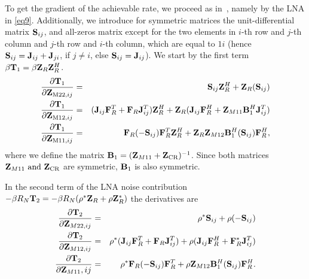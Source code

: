 To get the gradient of the achievable rate, we proceed as in~\cite{Yahia2013}, namely
by the LNA in  \eqref{eq9}.
Additionally, we introduce for symmetric matrices the unit-differential matrix $\mathbf{S}_{ij}$, and all-zeros matrix except for the two elements in $i$-th row and $j$-th column and $j$-th row and $i$-th column, which are equal to $1i$ (hence $\mathbf{S}_{ij} = \mathbf{J}_{ij} + \mathbf{J}_{ji}$, if $j\neq i$, else $\mathbf{S}_{ij} = \mathbf{J}_{ij}$). We start by the first term  $\beta\mathbf{T}_1=\beta \mathbf{Z}_R\mathbf{Z}_R^H$. 
\begin{eqnarray}
\frac{\partial \mat{T}_1}{\partial \mat{Z}_{\text{M22,}ij}}&=& 
	\mat{S}_{ij}\mat{Z}_R^H+\mat{Z}_R(\mat{S}_{ij}) \nonumber\\
\frac{\partial \mat{T}_1}{\partial \mat{Z}_{\text{M12,}ij}}&=& 
	(\mat{J}_{ij}\mat{F}_R^T+\mat{F}_R\mat{J}_{ij}^T)\mat{Z}_R^H+ %
\mat{Z}_R(\mat{J}_{ij}\mat{F}_R^H+\mat{Z}_{M11}\mat{B}_1^H\mat{J}_{ij}^T)  \nonumber \\
\frac{\partial \mat{T}_1}{\partial \mat{Z}_{\text{M11,}ij}}&=&
	\mat{F}_R(-\mat{S}_{ij})\mat{F}_R^T \mat{Z}_R^H +
	\mat{Z}_R\mat{Z}_{M12}\mat{B}_1^H(\mat{S}_{ij})\mat{F}_R^H,
\label{Shorteneddeirvatives}
\end{eqnarray}
where we define the matrix $\mathbf{B}_1=(\mathbf{Z}_{M11}+\mathbf{Z}_{\text{CR}})^{-1}$. Since both matrices $\mathbf{Z}_{M11}\text{ and }\mathbf{Z}_{\text{CR}}$ are symmetric, $\mathbf{B}_1$ is also symmetric.


In the second term of the LNA noise contribution $-\beta R_N\mathbf{T}_2=-\beta R_N(\rho^*\mathbf{Z}_R+\rho\mathbf{Z}_R^*)$ the derivatives are
\begin{eqnarray}
\frac{\partial \mathbf{T}_2}{\partial \mathbf{Z}_{M22,ij}}&=&
	\rho^*\mathbf{S}_{ij}+\rho (-\mathbf{S}_{ij}) \nonumber \\
\frac{\partial \mathbf{T}_2}{\partial \mathbf{Z}_{M12,ij}}&=&
	\rho^*(\mathbf{J}_{ij}\mathbf{F}_R^T+\mathbf{F}_R\mathbf{J}_{ij}^T)+ 
	\rho(\mathbf{J}_{ij}\mathbf{F}_R^{H}+\mathbf{F}_R^{*}\mathbf{J}_{ij}^T) \nonumber\\
\frac{\partial \mathbf{T}_2}{\partial \mathbf{Z}_{M11},ij}&=&
	\rho^*\mathbf{F}_R(-\mathbf{S}_{ij})\mathbf{F}_R^{T}+ 
	\rho \mathbf{Z}_{M12}\mathbf{B}_1^H(\mathbf{S}_{ij})\mathbf{F}_R^H.
\label{ShortenedpartialZ}
\end{eqnarray}



